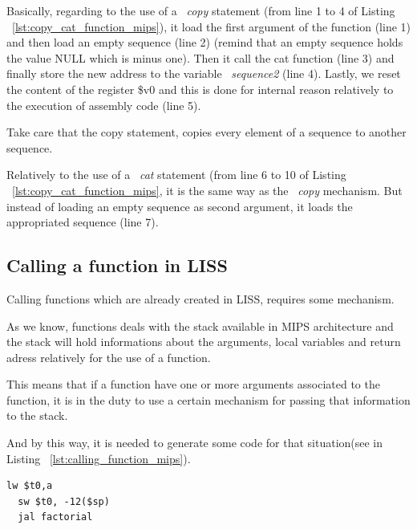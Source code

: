 \documentclass[
  oneside,
  11pt, a4paper,
  footinclude=true,
  headinclude=true,
  cleardoublepage=empty
]{scrbook}
\begin{document}
Basically, regarding to the use of a ~\textit{copy} statement (from line 1 to 4 of Listing ~\ref{lst:copy_cat_function_mips}), it load the first argument of the function (line 1) and then load an empty sequence (line 2) (remind that an empty sequence holds the value NULL which is minus one). Then it call the cat function (line 3) and finally store the new address to the variable ~\textit{sequence2} (line 4). Lastly, we reset the content of the register \$v0 and this is done for internal reason relatively to the execution of assembly code (line 5).

Take care that the copy statement, copies every element of a sequence to another sequence.


Relatively to the use of a ~\textit{cat} statement (from line 6 to 10 of Listing ~\ref{lst:copy_cat_function_mips}, it is the same way as the ~\textit{copy} mechanism. But instead of loading an empty sequence as second argument, it loads the appropriated sequence (line 7).





\subsection{Calling a function in LISS}

Calling functions which are already created in LISS,  requires some mechanism.

As we know, functions deals with the stack available in MIPS architecture and the stack will hold informations about the arguments, local variables and return adress relatively for the use of a function.

This means that if a function have one or more arguments associated to the function, it is in the duty to use a certain mechanism for passing that information to the stack.

And by this way, it is needed to generate some code for that situation(see in Listing ~\ref{lst:calling_function_mips}).

\begin{lstlisting}[caption={Code generated for calling a function in MIPS},label={lst:calling_function_mips}]
  lw $t0,a		
  sw $t0, -12($sp)
  jal factorial		
\end{lstlisting}
\end{document}
